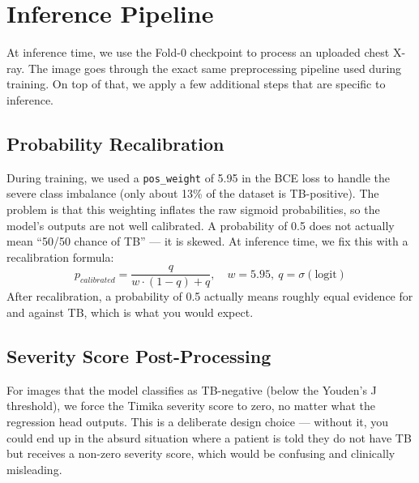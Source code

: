 \documentclass[12pt]{report}
\begin{document}
\section{Inference Pipeline}

At inference time, we use the Fold-0 checkpoint to process an uploaded chest X-ray. The image goes through the exact same preprocessing pipeline used during training. On top of that, we apply a few additional steps that are specific to inference.

\subsection{Probability Recalibration}
During training, we used a \texttt{pos\_weight} of 5.95 in the BCE loss to handle the severe class imbalance (only about 13\% of the dataset is TB-positive). The problem is that this weighting inflates the raw sigmoid probabilities, so the model's outputs are not well calibrated. A probability of 0.5 does not actually mean ``50/50 chance of TB'' --- it is skewed. At inference time, we fix this with a recalibration formula:
\begin{equation}
p_{calibrated} = \frac{q}{w \cdot (1 - q) + q}, \quad w = 5.95,\ q = \sigma(\text{logit})
\end{equation}
After recalibration, a probability of 0.5 actually means roughly equal evidence for and against TB, which is what you would expect.

\subsection{Severity Score Post-Processing}
For images that the model classifies as TB-negative (below the Youden's J threshold), we force the Timika severity score to zero, no matter what the regression head outputs. This is a deliberate design choice --- without it, you could end up in the absurd situation where a patient is told they do not have TB but receives a non-zero severity score, which would be confusing and clinically misleading.
\end{document}
